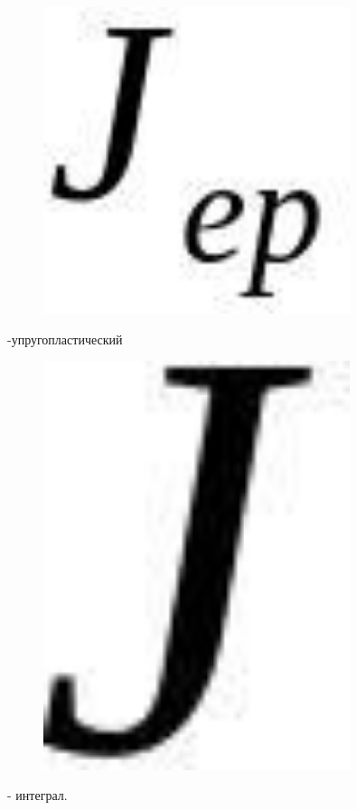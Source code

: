 \begin{figure}[H]
	\centering
	\includegraphics[width=0.8\textwidth]{assets/1166}
	\caption*{}
\end{figure}-упругопластический
\begin{figure}[H]
	\centering
	\includegraphics[width=0.8\textwidth]{assets/1167}
	\caption*{}
\end{figure}- интеграл.

